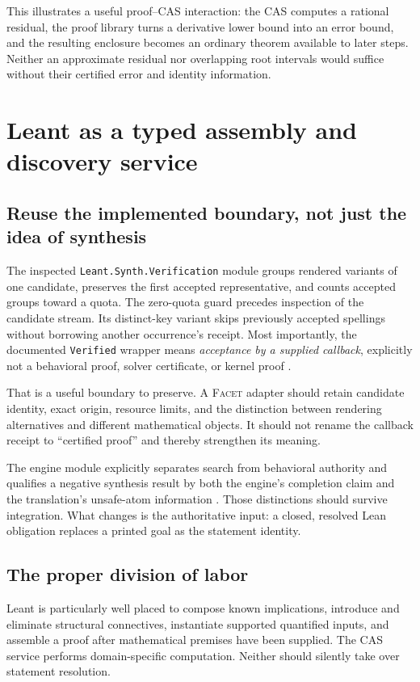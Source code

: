 \documentclass[11pt,letterpaper]{article}
\newcommand{\code}[1]{\nolinkurl{#1}}
\newcommand{\Facet}{\textsc{Facet}}
\numberwithin{equation}{section}
\begin{document}
This illustrates a useful proof--CAS interaction: the CAS computes a rational
residual, the proof library turns a derivative lower bound into an error bound,
and the resulting enclosure becomes an ordinary theorem available to later
steps. Neither an approximate residual nor overlapping root intervals would
suffice without their certified error and identity information.

\section{Leant as a typed assembly and discovery service}\label{sec:leant}
\subsection{Reuse the implemented boundary, not just the idea of synthesis}
The inspected \code{Leant.Synth.Verification} module groups rendered variants of
one candidate, preserves the first accepted representative, and counts accepted
groups toward a quota. The zero-quota guard precedes inspection of the candidate
stream. Its distinct-key variant skips previously accepted spellings without
borrowing another occurrence's receipt. Most importantly, the documented
\code{Verified} wrapper means \emph{acceptance by a supplied callback}, explicitly
not a behavioral proof, solver certificate, or kernel proof \cite{l-verification}.

That is a useful boundary to preserve. A \Facet{} adapter should retain candidate
identity, exact origin, resource limits, and the distinction between rendering
alternatives and different mathematical objects. It should not rename the
callback receipt to ``certified proof'' and thereby strengthen its meaning.

The engine module explicitly separates search from behavioral authority and
qualifies a negative synthesis result by both the engine's completion claim and
the translation's unsafe-atom information \cite{l-engine}. Those distinctions
should survive integration. What changes is the authoritative input: a closed,
resolved Lean obligation replaces a printed goal as the statement identity.

\subsection{The proper division of labor}
Leant is particularly well placed to compose known implications, introduce and
eliminate structural connectives, instantiate supported quantified inputs, and
assemble a proof after mathematical premises have been supplied. The CAS service
performs domain-specific computation. Neither should silently take over statement
resolution.
\end{document}
